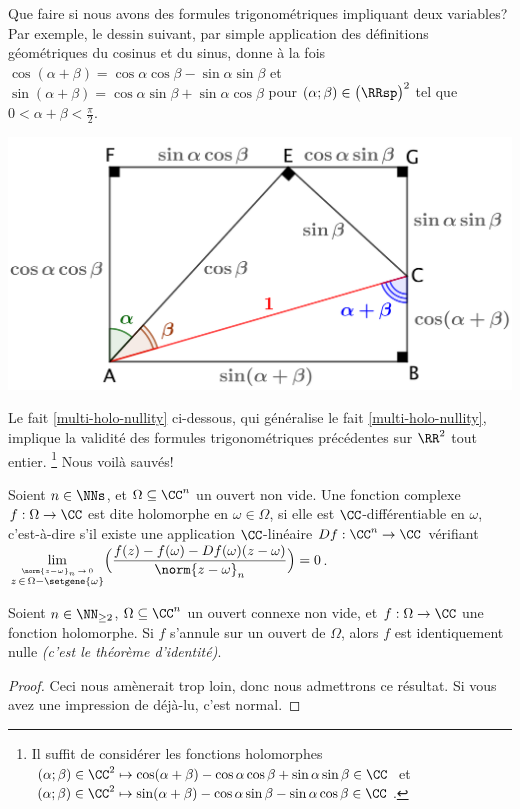 Que faire si nous avons des formules trigonométriques impliquant deux variables? Par exemple, le dessin suivant, par simple application des définitions géométriques du cosinus et du sinus, donne à la fois
$\cos(\alpha + \beta) = \cos \alpha \cos \beta - \sin \alpha \sin \beta$
et
$\sin(\alpha + \beta) = \cos \alpha \sin \beta + \sin \alpha \cos \beta$
pour
$(\alpha ; \beta) \in \big( \RRsp \big)^2$ tel que $0 < \alpha + \beta < \frac{\pi}{2}$. 

\begin{center}
	\includegraphics[scale=.7]{two-var-trig-formulas.png}
\end{center}

Le fait \ref{multi-holo-nullity} ci-dessous, qui généralise le fait \ref{multi-holo-nullity}, implique la validité des formules trigonométriques précédentes sur $\RR^2$ tout entier.%
\footnote{
	Il suffit de considérer les fonctions holomorphes
	$(\alpha ; \beta) \in \CC^2 \mapsto \cos(\alpha + \beta) - \cos \alpha \cos \beta + \sin \alpha \sin \beta \in \CC$
	et
	$(\alpha ; \beta) \in \CC^2 \mapsto \sin(\alpha + \beta) - \cos \alpha \sin \beta - \sin \alpha \cos \beta \in \CC$.
}
Nous voilà sauvés!


\begin{defi}
    Soient $n \in \NNs$, et $\Omega \subseteq \CC^n$ un ouvert non vide.
	Une fonction complexe $f: \Omega \rightarrow \CC$ est dite holomorphe en $\omega \in \Omega$, 
	si elle est $\CC$-différentiable en $\omega$,
	c'est-à-dire s'il existe une application $\CC$-linéaire $Df: \CC^n \rightarrow \CC$
	vérifiant
	$\displaystyle \lim_{\stackrel{\norm{z - \omega}_n \, \rightarrow \, 0}{z \, \in \, \Omega - \setgene{\omega}}}\!\Big( \frac{f(z) - f(\omega) - Df(\omega) (z - \omega)}{\norm{z - \omega}_n} \Big) = 0$.
\end{defi}


\begin{fact} \label{multi-holo-nullity}
    Soient $n \in \NN_{\geq 2}$,
    $\Omega \subseteq \CC^n$ un ouvert connexe non vide,
    et
    $f: \Omega \rightarrow \CC$ une fonction holomorphe.
	Si $f$ s'annule sur un ouvert de $\Omega$,
	alors $f$ est identiquement nulle
	\emph{(c'est le théorème d'identité)}. 
\end{fact}


\begin{proof}
	Ceci nous amènerait trop loin, donc nous admettrons ce résultat. Si vous avez une impression de déjà-lu, c'est normal.
\end{proof}
